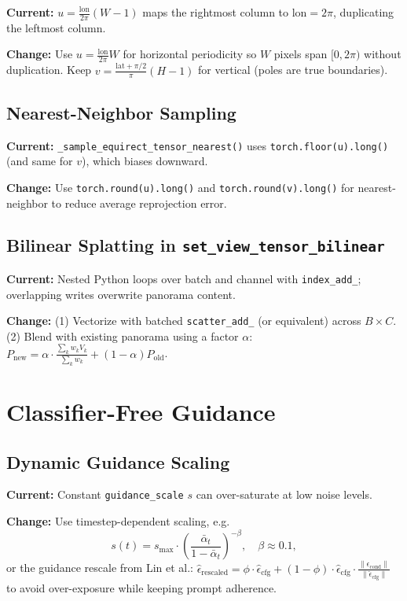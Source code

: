 \documentclass[11pt,a4paper]{article}
\newcommand{\fn}[1]{\texttt{#1}}
\begin{document}
\textbf{Current:} $u = \frac{\text{lon}}{2\pi}(W-1)$ maps the rightmost column to $\text{lon}=2\pi$, duplicating the leftmost column.

\textbf{Change:} Use $u = \frac{\text{lon}}{2\pi} W$ for horizontal periodicity so $W$ pixels span $[0,2\pi)$ without duplication. Keep $v = \frac{\text{lat}+\pi/2}{\pi}(H-1)$ for vertical (poles are true boundaries).

\subsection{Nearest-Neighbor Sampling}

\textbf{Current:} \fn{\_sample\_equirect\_tensor\_nearest()} uses \fn{torch.floor(u).long()} (and same for $v$), which biases downward.

\textbf{Change:} Use \fn{torch.round(u).long()} and \fn{torch.round(v).long()} for nearest-neighbor to reduce average reprojection error.

\subsection{Bilinear Splatting in \fn{set\_view\_tensor\_bilinear}}

\textbf{Current:} Nested Python loops over batch and channel with \fn{index\_add\_}; overlapping writes overwrite panorama content.

\textbf{Change:} (1) Vectorize with batched \fn{scatter\_add\_} (or equivalent) across $B \times C$. (2) Blend with existing panorama using a factor $\alpha$: $P_{\text{new}} = \alpha \cdot \frac{\sum_k w_k V_k}{\sum_k w_k} + (1-\alpha) P_{\text{old}}$.

\section{Classifier-Free Guidance}

\subsection{Dynamic Guidance Scaling}

\textbf{Current:} Constant \fn{guidance\_scale} $s$ can over-saturate at low noise levels.

\textbf{Change:} Use timestep-dependent scaling, e.g.\
\begin{equation}
s(t) = s_{\max} \cdot \left(\frac{\bar{\alpha}_t}{1-\bar{\alpha}_t}\right)^{-\beta}, \quad \beta \approx 0.1,
\end{equation}
or the guidance rescale from Lin et al.: $\hat{\epsilon}_{\text{rescaled}} = \phi \cdot \hat{\epsilon}_{\text{cfg}} + (1-\phi) \cdot \hat{\epsilon}_{\text{cfg}} \cdot \frac{\|\epsilon_{\text{cond}}\|}{\|\hat{\epsilon}_{\text{cfg}}\|}$ to avoid over-exposure while keeping prompt adherence.
\end{document}
